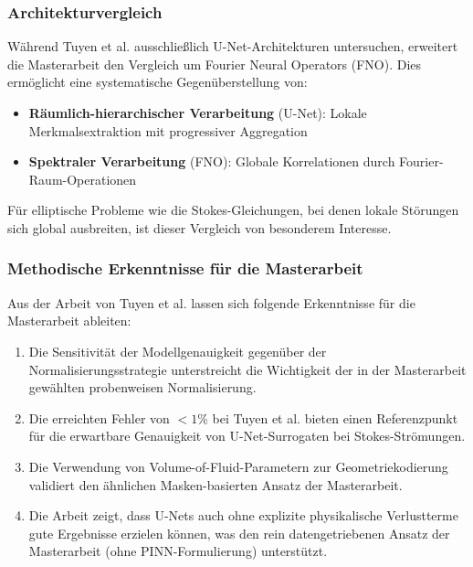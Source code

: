 \documentclass[a4paper,12pt]{article}
\begin{document}
\subsubsection*{Architekturvergleich}

Während Tuyen et al. ausschließlich U-Net-Architekturen untersuchen, erweitert die Masterarbeit den Vergleich um Fourier Neural Operators (FNO). Dies ermöglicht eine systematische Gegenüberstellung von:
\begin{itemize}
    \item \textbf{Räumlich-hierarchischer Verarbeitung} (U-Net): Lokale Merkmalsextraktion mit progressiver Aggregation
    \item \textbf{Spektraler Verarbeitung} (FNO): Globale Korrelationen durch Fourier-Raum-Operationen
\end{itemize}
Für elliptische Probleme wie die Stokes-Gleichungen, bei denen lokale Störungen sich global ausbreiten, ist dieser Vergleich von besonderem Interesse.

\subsubsection*{Methodische Erkenntnisse für die Masterarbeit}

Aus der Arbeit von Tuyen et al. lassen sich folgende Erkenntnisse für die Masterarbeit ableiten:
\begin{enumerate}
    \item Die Sensitivität der Modellgenauigkeit gegenüber der Normalisierungsstrategie unterstreicht die Wichtigkeit der in der Masterarbeit gewählten probenweisen Normalisierung.
    \item Die erreichten Fehler von $< 1\%$ bei Tuyen et al. bieten einen Referenzpunkt für die erwartbare Genauigkeit von U-Net-Surrogaten bei Stokes-Strömungen.
    \item Die Verwendung von Volume-of-Fluid-Parametern zur Geometriekodierung validiert den ähnlichen Masken-basierten Ansatz der Masterarbeit.
    \item Die Arbeit zeigt, dass U-Nets auch ohne explizite physikalische Verlustterme gute Ergebnisse erzielen können, was den rein datengetriebenen Ansatz der Masterarbeit (ohne PINN-Formulierung) unterstützt.
\end{enumerate}
\end{document}
